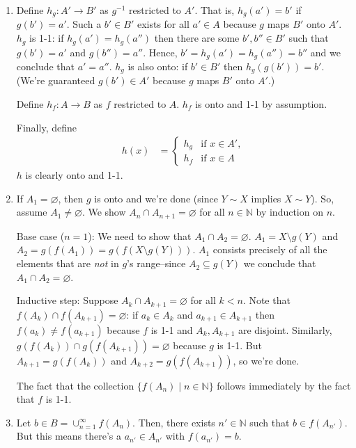 \documentclass[a4paper]{report}
\newenvironment{ex}[1]
    {\noindent{\large \bf Exercise #1.}}{\vspace{0.5cm}}
\begin{document}
\begin{ex}{1.5.11}
  \begin{enumerate}[label=\alph*)]
  \item Define $h_g : A' \rightarrow B'$ as $g^{-1}$ restricted to $A'$. That
    is, $h_g(a') = b'$ if $g(b') = a'$. Such a $b' \in B'$ exists for all $a'
    \in A$ because $g$ maps $B'$ onto $A'$. $h_g$ is 1-1: if $h_g(a') = h_g(a'')$
    then there are some $b', b'' \in B'$ such that $g(b') = a'$ and $g(b'') =
    a''$.  Hence, $b' = h_g(a') = h_g(a'') = b''$ and we conclude that $a' =
    a''$. $h_g$ is also onto: if $b' \in B'$ then $h_g(g(b')) = b'$. (We're
    guaranteed $g(b') \in A'$ because $g$ maps $B'$ onto $A'$.)

    Define $h_f : A \rightarrow B$ as $f$ restricted to $A$. $h_f$ is onto and
    1-1 by assumption.

    Finally, define
    \begin{align*}
      h(x) &= \begin{cases}
        h_g & \text {if $x \in A'$}, \\
        h_f & \text {if $x \in A$}
              \end{cases}
    \end{align*}
    $h$ is clearly onto and 1-1.
  \item If $A_1 = \varnothing$, then $g$ is onto and we're done (since $Y \sim
    X$ implies $X \sim Y$). So, assume $A_1 \neq \varnothing$. We show $A_n \cap
    A_{n+1} = \varnothing$ for all $n \in \mathbb{N}$ by induction on $n$.

    Base case ($n = 1$): We need to show that $A_1 \cap A_2 = \varnothing$.
    $A_1 = X\setminus g(Y)$ and $A_2 = g(f(A_1)) = g(f(X \setminus g(Y)))$. $A_1$
    consists precisely of all the elements that are \emph{not} in $g$'s
    range--since $A_2 \subseteq g(Y)$ we conclude that $A_1 \cap A_2 =
    \varnothing$.

    Inductive step: Suppose $A_{k} \cap A_{k+1} = \varnothing$ for all $k < n$.
    Note that $f(A_k) \cap f(A_{k+1}) = \varnothing$: if $a_k
    \in A_k$ and $a_{k+1} \in A_{k+1}$ then $f(a_k) \neq f(a_{k+1})$ because $f$
    is 1-1 and $A_{k}, A_{k+1}$ are disjoint. Similarly, $g(f(A_k)) \cap
    g(f(A_{k+1})) = \varnothing$ because $g$ is 1-1. But $A_{k+1} = g(f(A_k))$
    and $A_{k+2} = g(f(A_{k+1}))$, so we're done.

    The fact that the collection $\{f(A_n) \mid n \in \mathbb{N}\}$ follows
    immediately by the fact that $f$ is 1-1.
  \item Let $b \in B = \cup_{n=1}^{\infty} f(A_n)$. Then, there exists $n' \in
    \mathbb{N}$ such that $b \in f(A_{n'})$. But this means there's a $a_{n'}
    \in A_{n'}$ with $f(a_{n'}) = b$.
  \end{enumerate}
\end{ex}
\end{document}
